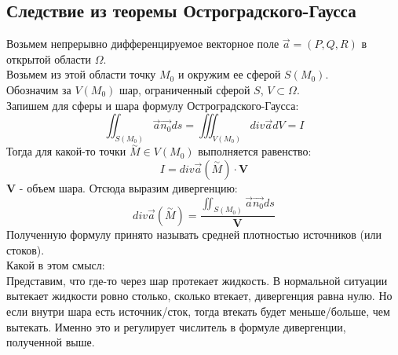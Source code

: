 \documentclass[12pt]{article}
\begin{document}
\subsection{Следствие из теоремы Остроградского-Гаусса}
Возьмем непрерывно дифференцируемое векторное поле $\overrightarrow{a} = (P,Q,R)$ в открытой области $\Omega$.\\
Возьмем из этой области точку $M_0$ и окружим ее сферой $S(M_0)$.\\
Обозначим за $V(M_0)$ шар, ограниченный сферой $S$, $V \subset \Omega$.\\
Запишем для сферы и шара формулу Остроградского-Гаусса:\\
$$\iint_{S(M_0)} \overrightarrow{a} \overrightarrow{n_0} ds =\iiint_{V(M_0)} div \overrightarrow{a} dV = I$$
Тогда для какой-то точки $\overset{\sim}{M} \in V(M_0)$ выполняется равенство:\\
$$I = div \overrightarrow{a} (\overset{\sim}{M}) \cdot \textbf{V}$$
$\textbf{V}$ - объем шара. Отсюда выразим дивергенцию:\\
$$div \overrightarrow{a} (\overset{\sim}{M}) = \frac{\iint_{S(M_0)} \overrightarrow{a} \overrightarrow{n_0} ds}{\textbf{V}}$$
Полученную формулу принято называть средней плотностью источников (или стоков).\\
Какой в этом смысл:\\
Представим, что где-то через шар протекает жидкость. В нормальной ситуации вытекает жидкости ровно столько, сколько втекает, дивергенция равна нулю. Но если внутри шара есть источник/сток, тогда втекать будет меньше/больше, чем вытекать. Именно это и регулирует числитель в формуле дивергенции, полученной выше.\\
\end{document}

